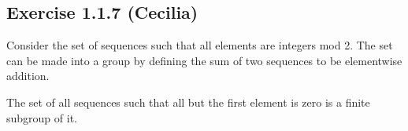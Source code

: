 \subsection*{Exercise 1.1.7 (Cecilia)}

Consider the set of sequences such that all elements are integers mod 2. The set can be made into a group by defining the sum of two sequences to be elementwise addition.

The set of all sequences such that all but the first element is zero is a finite subgroup of it.


